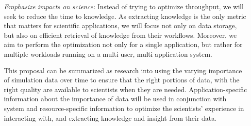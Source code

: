 \begin{tightItemize}
\item
{\em Emphasize impacts on science:}
Instead of trying to optimize throughput, we will seek to reduce the time to knowledge.
As extracting knowledge is the only metric that matters for scientific applications, we will
focus not only on data storage, but also on efficient retrieval of knowledge from their 
workflows.
Moreover, we aim to perform the optimization not only for a single
application, but rather for multiple workloads running on a multi-user, multi-application
system.
\end{tightItemize}

This proposal can be summarized as research into using the varying importance of simulation data over time to
ensure that the right portions of data, with the right quality  are available to scientists when they are needed.
Application-specific information about the importance of data will be used in conjunction with system and resource-specific information
to optimize the scientists' experience in interacting with, and extracting knowledge and insight from their data.


